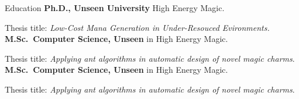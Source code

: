 \begin{rubric}{Education}
\entry*[2009 -- 2013]%
	\textbf{Ph.D., Unseen University} High Energy Magic.
	\par Thesis title: \emph{Low-Cost Mana Generation in Under-Resouced Evironments.}
%
\entry*[2003 -- 2006]%
	\textbf{M.Sc.~Computer Science, Unseen} in High Energy Magic.\par
	Thesis title: \emph{Applying ant algorithms in automatic design of novel magic charms}.
% 
\entry*[2003 -- 2006]%
	\textbf{M.Sc.~Computer Science, Unseen} in High Energy Magic.\par
	Thesis title: \emph{Applying ant algorithms in automatic design of novel magic charms}.
\end{rubric}
